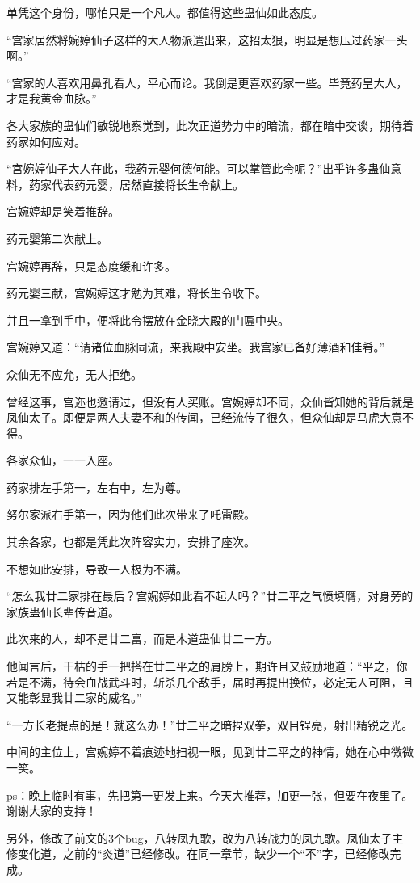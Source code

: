 \begin{this_body}
单凭这个身份，哪怕只是一个凡人。都值得这些蛊仙如此态度。

“宫家居然将婉婷仙子这样的大人物派遣出来，这招太狠，明显是想压过药家一头啊。”

“宫家的人喜欢用鼻孔看人，平心而论。我倒是更喜欢药家一些。毕竟药皇大人，才是我黄金血脉。”

各大家族的蛊仙们敏锐地察觉到，此次正道势力中的暗流，都在暗中交谈，期待着药家如何应对。

“宫婉婷仙子大人在此，我药元婴何德何能。可以掌管此令呢？”出乎许多蛊仙意料，药家代表药元婴，居然直接将长生令献上。

宫婉婷却是笑着推辞。

药元婴第二次献上。

宫婉婷再辞，只是态度缓和许多。

药元婴三献，宫婉婷这才勉为其难，将长生令收下。

并且一拿到手中，便将此令摆放在金晓大殿的门匾中央。

宫婉婷又道：“请诸位血脉同流，来我殿中安坐。我宫家已备好薄酒和佳肴。”

众仙无不应允，无人拒绝。

曾经这事，宫迩也邀请过，但没有人买账。宫婉婷却不同，众仙皆知她的背后就是凤仙太子。即便是两人夫妻不和的传闻，已经流传了很久，但众仙却是马虎大意不得。

各家众仙，一一入座。

药家排左手第一，左右中，左为尊。

努尔家派右手第一，因为他们此次带来了吒雷殿。

其余各家，也都是凭此次阵容实力，安排了座次。

不想如此安排，导致一人极为不满。

“怎么我廿二家排在最后？宫婉婷如此看不起人吗？”廿二平之气愤填膺，对身旁的家族蛊仙长辈传音道。

此次来的人，却不是廿二富，而是木道蛊仙廿二一方。

他闻言后，干枯的手一把搭在廿二平之的肩膀上，期许且又鼓励地道：“平之，你若是不满，待会血战武斗时，斩杀几个敌手，届时再提出换位，必定无人可阻，且又能彰显我廿二家的威名。”

“一方长老提点的是！就这么办！”廿二平之暗捏双拳，双目锃亮，射出精锐之光。

中间的主位上，宫婉婷不着痕迹地扫视一眼，见到廿二平之的神情，她在心中微微一笑。

ps：晚上临时有事，先把第一更发上来。今天大推荐，加更一张，但要在夜里了。谢谢大家的支持！

另外，修改了前文的3个bug，八转凤九歌，改为八转战力的凤九歌。凤仙太子主修变化道，之前的“炎道”已经修改。在同一章节，缺少一个“不”字，已经修改完成。

\end{this_body}

